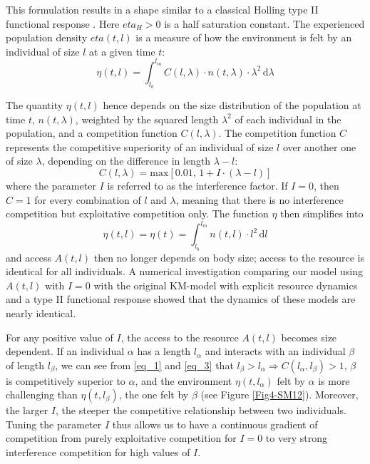 This formulation results in a shape similar to a classical Holling type II
functional response \autocite{holling1965a}. Here $eta_H>0$ is a half 
saturation constant. The experienced population density $eta(t,l)$ is a measure
of how the environment is felt by an individual of size $l$ at a given time $t$:
\begin{equation}
\label{eq_2}
\eta(t,l)=\int_{l_b}^{l_m} \! C(l,\lambda)\cdot n(t,\lambda)\cdot\lambda^2\, \mathrm{d}\lambda
\end{equation}

The quantity $\eta(t,l)$ hence depends on the size distribution of the
population at time $t$, $n(t,\lambda)$, weighted by the squared length
$\lambda^2$ of each individual in the population, and a competition function
$C(l,\lambda)$. The competition function $C$ represents the competitive
superiority of an individual of size $l$ over another one of size $\lambda$,
depending on the difference in length $\lambda-l$:
\begin{equation}
\label{eq_3}
C(l,\lambda) = \mathrm{max}\left[ 0.01,\, 1+I\cdot(\lambda-l) \right]
\end{equation}
where the parameter $I$ is referred to as the interference factor. If $I=0$,
then $C=1$ for every combination of $l$ and $\lambda$, meaning that there is no
interference competition but exploitative competition only. The function $\eta$
then simplifies into
\begin{equation}
\label{eq_4}
\eta (t,l) = \eta(t) = \int_{l_b}^{l_m} \! n(t,l)\cdot l^2\, \mathrm{d}l
\end{equation}
and access $A(t,l)$ then no longer depends on body size; access to the resource
is identical for all individuals. A numerical investigation comparing our model
using $A(t,l)$ with $I=0$ with the original KM-model with explicit resource
dynamics and a type II functional response showed that the dynamics of these
models are nearly identical.

For any positive value of $I$, the access to the resource $A(t,l)$ becomes size
dependent. If an individual $\alpha$ has a length $l_{\alpha}$ and interacts
with an individual $\beta$ of length $l_{\beta}$, we can see from \eqref{eq_1}
and \eqref{eq_3} that $l_{\beta}>l_{\alpha} \Rightarrow
C(l_{\alpha},l_{\beta})>1$, $\beta$ is competitively superior to $\alpha$, and
the environment $\eta(t,l_{\alpha})$ felt by $\alpha$ is more challenging than
$\eta(t,l_{\beta})$, the one felt by $\beta$ (see Figure \ref{Fig4-SM12}).
Moreover, the larger $I$, the steeper the competitive relationship between two
individuals. Tuning the parameter $I$ thus allows us to have a continuous
gradient of competition from purely exploitative competition for $I=0$ to very
strong interference competition for high values of $I$.

